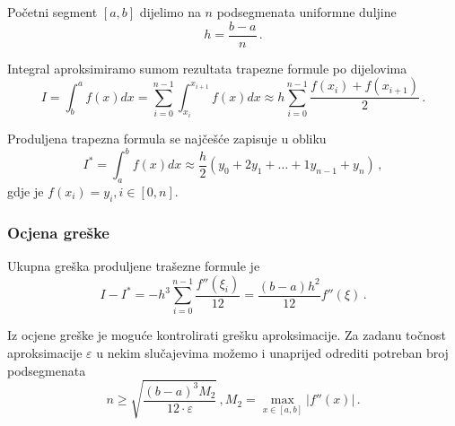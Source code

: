 Početni segment $[a,b]$ dijelimo na $n$ podsegmenata uniformne duljine
$$
h = \frac{b-a}{n}\,.
$$

Integral aproksimiramo sumom rezultata trapezne formule po dijelovima
$$
I = \int_{b}^{a} f(x)dx = \sum_{i=0}^{n-1} \int_{x_i}^{x_{i+1}}f(x)dx \approx h \sum_{i=0}^{n-1} \frac{f(x_i)+f(x_{i+1})}{2}\,.
$$

Produljena trapezna formula se najčešće zapisuje u obliku
$$
I^* = \int_{a}^{b} f(x)dx \approx \frac{h}{2}(y_0+2y_1+\dots+1y_{n-1}+y_n)\,,
$$
gdje je $f(x_i) = y_i, i\in [0, n]$.



\subsubsection{Ocjena greške}

Ukupna greška produljene trašezne formule je
$$
I - I^* = -h^3 \sum_{i=0}^{n-1} \frac{f''(\xi_i)}{12} = \frac{(b-a)h^2}{12}f''(\xi)\,.
$$

Iz ocjene greške je moguće kontrolirati grešku aproksimacije.
Za zadanu točnost aproksimacije $\varepsilon$ u nekim slučajevima možemo i unaprijed odrediti potreban broj podsegmenata
$$
n \geq \sqrt{\frac{(b-a)^3M_2}{12 \cdot \varepsilon}}\,, M_2 = \max_{x\in[a,b]}|f''(x)|\,.
$$
